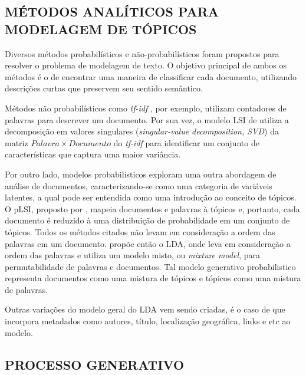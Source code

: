 \documentclass[12pt,a4paper]{article}
\begin{document}


\subsection{MÉTODOS ANALÍTICOS PARA MODELAGEM DE TÓPICOS} \label{sec:trabalhos-relacionados}

Diversos métodos probabilísticos e não-probabilísticos foram propostos para resolver o problema de modelagem de texto. O objetivo
 principal de ambos os métodos é o de encontrar uma maneira de classificar cada documento, utilizando descrições curtas que preservem
 seu sentido semântico.

Métodos não probabilísticos como \textit{tf-idf} \cite{salton1983introduction}, por exemplo, utilizam contadores de palavras para descrever um documento.
 Por sua vez, o modelo LSI de  utiliza a decomposição em valores singulares (\textit{singular-value decomposition, SVD}) da
 matriz $Palavra \times Documento$ do \textit{tf-idf} para identificar um conjunto de características que captura uma maior variância.

Por outro lado, modelos probabilísticos exploram uma outra abordagem de análise de documentos, caracterizando-se como uma categoria de variáveis latentes, a qual pode ser entendida como uma introdução ao conceito de tópicos. O pLSI, proposto por , 
 mapeia documentos e palavras à tópicos e, portanto, cada documento é reduzido à uma distribuição de probabilidade em um conjunto de tópicos.
 Todos os métodos citados não levam em consideração a ordem das palavras em um documento.  propõe então o
 LDA, onde leva em consideração a ordem das palavras e utiliza um modelo misto, ou \textit{mixture model}, para permutabilidade de palavras e documentos. Tal
 modelo generativo probabilistico representa documentos como uma mistura de tópicos e tópicos como uma mistura de palavras.

Outras variações do modelo geral do LDA vem sendo criadas, é o caso de 
 que incorpora metadados como autores, título, localização geográfica, links e etc ao modelo.
\subsection{PROCESSO GENERATIVO} \label{sec:processo-generativo}
\end{document}
